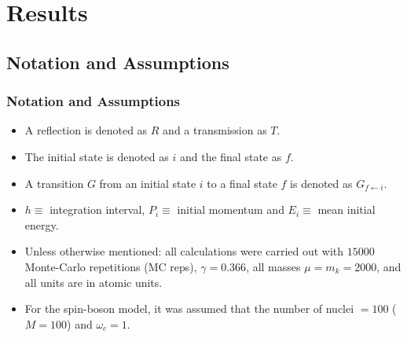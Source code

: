 \documentclass[xetex,mathserif,serif]{beamer}
\begin{document}
\section{Results}
\subsection{Notation and Assumptions}
\begin{frame}
\frametitle{Notation and Assumptions}
\begin{itemize}
\item A reflection is denoted as $ R $ and a transmission as $ T $.
\item The initial state is denoted as $ i $ and the final state as $ f $.
\item A transition $ G $ from an initial state $ i $ to a final state $ f $ is denoted as $ G_{f\leftarrow i} $.
\item $ h \equiv $ integration interval, $ P_{i} \equiv $ initial momentum and $ E_{i} \equiv $ mean initial energy.
\item Unless otherwise mentioned: all calculations were carried out with $ 15000 $ Monte-Carlo repetitions (MC reps), $ \gamma = 0.366 $, all masses $ \mu = m_{k} = 2000 $, and all units are in atomic units.
\item For the spin-boson model, it was assumed that the number of nuclei $= 100 $ ($ M=100 $) and $ \omega_{c} = 1 $.
\end{itemize}
\end{frame}
\end{document}
